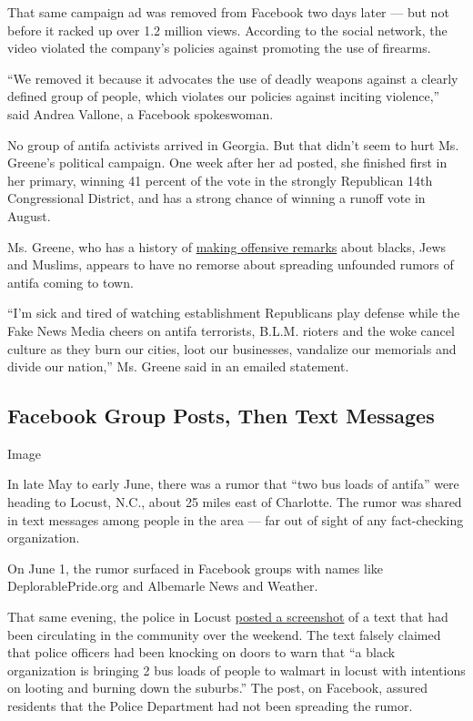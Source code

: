 That same campaign ad was removed from Facebook two days later --- but
not before it racked up over 1.2 million views. According to the social
network, the video violated the company's policies against promoting the
use of firearms.

``We removed it because it advocates the use of deadly weapons against a
clearly defined group of people, which violates our policies against
inciting violence,'' said Andrea Vallone, a Facebook spokeswoman.

No group of antifa activists arrived in Georgia. But that didn't seem to
hurt Ms. Greene's political campaign. One week after her ad posted, she
finished first in her primary, winning 41 percent of the vote in the
strongly Republican 14th Congressional District, and has a strong chance
of winning a runoff vote in August.

Ms. Greene, who has a history of
\href{https://www.nytimes3xbfgragh.onion/2020/06/17/us/marjorie-taylor-greene-georgia.html}{making
offensive remarks} about blacks, Jews and Muslims, appears to have no
remorse about spreading unfounded rumors of antifa coming to town.

``I'm sick and tired of watching establishment Republicans play defense
while the Fake News Media cheers on antifa terrorists, B.L.M. rioters
and the woke cancel culture as they burn our cities, loot our
businesses, vandalize our memorials and divide our nation,'' Ms. Greene
said in an emailed statement.

\hypertarget{facebook-group-posts-then-text-messages}{%
\subsection{Facebook Group Posts, Then Text
Messages}\label{facebook-group-posts-then-text-messages}}

Image

In late May to early June, there was a rumor that ``two bus loads of
antifa'' were heading to Locust, N.C., about 25 miles east of Charlotte.
The rumor was shared in text messages among people in the area --- far
out of sight of any fact-checking organization.

On June 1, the rumor surfaced in Facebook groups with names like
DeplorablePride.org and Albemarle News and Weather.

That same evening, the police in Locust
\href{https://www.facebookcorewwwi.onion/971105932951713/photos/a.1627165354012431/3050055735056712/?type=3\&__xts__\%5B0\%5D=68.ARA_CCbgmvw1vn-Rpj-uzp23zApNlmhYrmV7kAtkCrWO5lfHA5skNnUYW2fj_5wf6r8kxnpw_dwH0ucrGRhE-2HEtaM9AyVNqOLSMcNBInwixXXKwUdH2idPkUXkBB1zLlC-XbjjgGtx0GcK98L5LviWf207V-RyJDtJoCrK_mr6p2b1n-xKWBX0d-3DeX4fw3mbnXtcq1l_EixqJKZ-fp0Ellypj2SkkfshKk53Qu6G81p6t1sn9WMXz9tYxCvp7RxCHyK9rt5gTs7UQVRw3SdA0ijGo-roueC8w7bWpwFYl88ZINOTTmfR0H5HrEWgqF5pUJZOtraFuQOlZPf0KK6tTw\&__tn__=-R}{posted
a screenshot} of a text that had been circulating in the community over
the weekend. The text falsely claimed that police officers had been
knocking on doors to warn that ``a black organization is bringing 2 bus
loads of people to walmart in locust with intentions on looting and
burning down the suburbs.'' The post, on Facebook, assured residents
that the Police Department had not been spreading the rumor.

